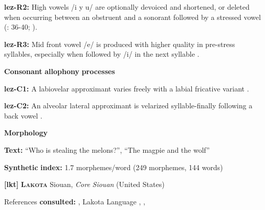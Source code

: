 \documentclass[output=paper]{langsci/langscibook}
\begin{document}
\begin{styleBody}
\textbf{lez-R2:} High vowels /i y u/ are optionally devoiced and shortened, or deleted when occurring between an obstruent and a sonorant followed by a stressed vowel (\citealt{Haspelmath1993}: 36-40; \citealt{ChitoranBabaliyeva2007}).
\end{styleBody}

\begin{styleBody}
\textbf{lez-R3:} Mid front vowel /e/ is produced with higher quality in pre-stress syllables, especially when followed by /i/ in the next syllable \citep[32]{Haspelmath1993}.
\end{styleBody}

\begin{styleBody}
\textbf{Consonant} \textbf{allophony} \textbf{processes}
\end{styleBody}

\begin{styleBody}
\textbf{lez-C1:} A labiovelar approximant varies freely with a labial fricative variant \citep[35]{Haspelmath1993}.
\end{styleBody}

\begin{styleBody}
\textbf{lez-C2:} An alveolar lateral approximant is velarized syllable-finally following a back vowel \citep[35]{Haspelmath1993}.
\end{styleBody}

\begin{styleBody}
\textbf{Morphology}
\end{styleBody}

\begin{styleBody}
\textbf{Text:} “Who is stealing the melons?”, “The magpie and the wolf” \citep[448-456]{Haspelmath1993}
\end{styleBody}

\begin{styleBody}
\textbf{Synthetic} \textbf{index:} 1.7 morphemes/word (249 morphemes, 144 words)
\end{styleBody}

\begin{styleBody}
\textbf{[lkt]}   \textbf{\textsc{Lakota}}    Siouan, \textit{Core} \textit{Siouan} (United States)
\end{styleBody}

\begin{styleBody}
References \textbf{consulted:} \citet{Ingham2003}, Lakota Language \citet{Consortium2008}, \citet{Mirzayan2010}, \citet{RoodTaylor1996}
\end{styleBody}
\end{document}

